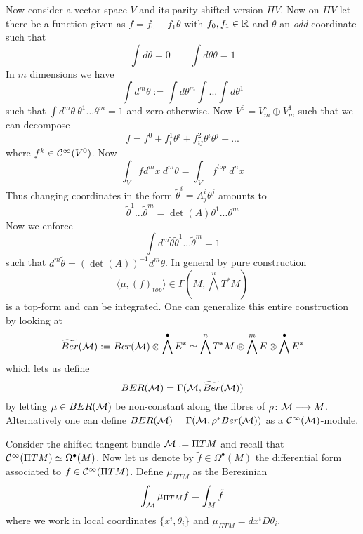 \begin{rem}
  Now consider a vector space $V$ and its parity-shifted version $\Pi V$. Now on $\Pi V$ let there be a function given as $f = f_0 + f_1 \theta$ with $f_0, f_1 \in \mathbb{R}$ and $\theta$ an \emph{odd} coordinate such that
  $$ \int d\theta = 0 \quad  \quad \int d\theta \theta = 1 $$
  In $m$ dimensions we have
  $$ \int d^m \theta := \int d\theta^m \int ... \int d\theta^1 $$
  such that $\int d^m \theta \ \theta^1 ... \theta^m = 1$ and zero otherwise. Now $V^0 = V_m^\circ \oplus V^1_m$ such that we can decompose
  $$ f = f^0 + f^1_i \theta^i + f^2_{ij} \theta^i \theta^j + ... $$
  where $f^k \in \mathcal{C}^{\infty}(V^0)$. Now
  $$ \int_V f d^mx \ d^m \theta = \int_{V^\circ} f^{top} \ d^n x $$
  Thus changing coordinates in the form $\widetilde{\theta}^i = A^i_j \theta^j$ amounts to
  $$ \widetilde{\theta}^1 ... \widetilde{\theta}^m = \det(A) \theta^1 ... \theta^m $$
  Now we enforce
  $$ \int d^m \widetilde{\theta} \widetilde{\theta}^1 ... \widetilde{\theta}^m = 1 $$
  such that $d^m \widetilde{\theta} = (\det(A))^{-1} d^m \theta$. In general by pure construction
  $$ \langle \mu, (f)_{top} \rangle \in \Gamma(M, \bigwedge^n T^* M) $$
  is a top-form and can be integrated. One can generalize this entire construction by looking at
  \begin{equation}
    \widetilde{Ber}(\mathcal{M}) := Ber(\mathcal{M}) \otimes \bigwedge^\bullet E^* \simeq \bigwedge^n T^*M \otimes \bigwedge^m E \otimes \bigwedge^\bullet E^*
  \end{equation}
  which lets us define
  \begin{equation}
    BER(\mathcal{M}) = \Gamma(\mathcal{M}, \widetilde{Ber}(\mathcal{M}))
  \end{equation}
  by letting $\mu \in BER(\mathcal{M})$ be non-constant along the fibres of $\rho \colon \mathcal{M} \longrightarrow M$. Alternatively one can define $BER(\mathcal{M})= \Gamma(\mathcal{M}, \rho^*Ber(\mathcal{M}))$ as a $\mathcal{C}^{\infty}(\mathcal{M})$-module.

  \begin{example}
    Consider the shifted tangent bundle $\mathcal{M} := \Pi TM$ and recall that $\mathcal{C}^{\infty}(\Pi TM) \simeq \Omega^\bullet(M)$. Now let us denote by $\tilde{f} \in \Omega^\bullet(M)$ the differential form associated to $f \in \mathcal{C}^{\infty}(\Pi TM)$. Define $\mu_{\Pi TM}$ as the Berezinian
    $$ \int_{\mathcal{M}} \mu_{\Pi TM} f = \int_M \tilde{f} $$
    where we work in local coordinates $\{x^i, \theta_i\}$ and $\mu_{\Pi TM} = dx^i D\theta_i$.
  \end{example}


\end{rem}
